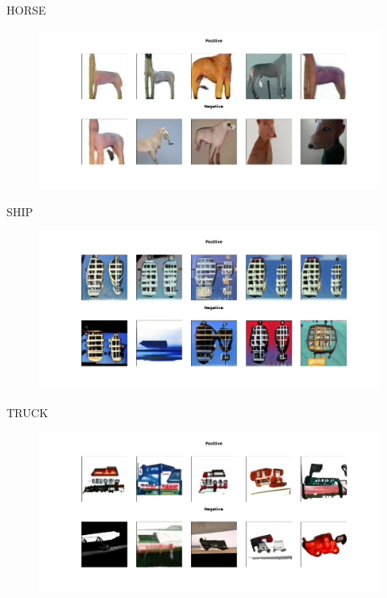 \documentclass[11pt,a4paper,openany]{book}
\begin{document}
\newline
HORSE
\begin{figure}[ht!]
    \centering
    \includegraphics[scale=0.4]{figs/cifar10_examples/horse.png}
\end{figure}
\newpage
\noindent SHIP
\begin{figure}[ht!]
    \centering
    \includegraphics[scale=0.4]{figs/cifar10_examples/ship.png}
\end{figure}
\newline
TRUCK
\begin{figure}[ht!]
    \centering
    \includegraphics[scale=0.4]{figs/cifar10_examples/truck.png}
\end{figure}
\end{document}

